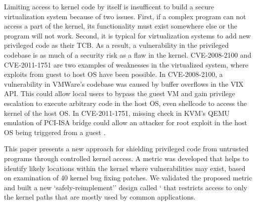 Limiting access to kernel code by itself is insufficent to build a secure virtualization system because of two issues.
First, if a complex program can not access a part of the kernel, its functionality must exist somewhere else or the program will not work.
Second, it is typical for virtualization systems to add new privileged code as their TCB.
As a result, a vulnerability in the privileged codebase is as much of a security risk as a flaw in the kernel.
CVE-2008-2100 and CVE-2011-1751 are two examples of weaknesses in the virtualized system, where exploits from guest to host OS have been possible.
In CVE-2008-2100, a vulnerability in VMWare's codebase was caused by buffer overflows in the VIX API.
This could allow local users to bypass the guest VM and gain privilege escalation to execute arbitrary code in the host OS,
even shellcode to access the kernel of the host OS. In CVE-2011-1751, missing check in KVM's QEMU emulation of PCI-ISA bridge
could allow an attacker for root exploit in the host OS being triggered from a guest \cite{Virtunoid}.




This paper presents a new approach for shielding privileged code from untrusted
programs through controlled kernel access.
A metric was developed that helps to identify likely locations
within the kernel where vulnerabilities may exist, based on examination of
40 kernel bug fixing patches. We validated the proposed metric and built a new
`safely-reimplement'' design %
called ` that restricts access to only the
kernel paths that are mostly used by common applications.

